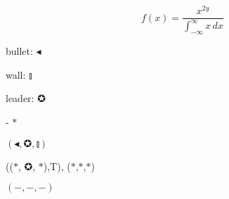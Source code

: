 \documentclass{article}
\begin{document}
\begin{equation*}
  f(x) = \frac{x^{2y}}{\int_{-\infty}^{\infty} x \,dx}  
\end{equation*}

bullet: $\smallblacktriangleleft$

wall: $\talloblong$

leader: $\circledstar$

- $\ast$

$(\smallblacktriangleleft,\circledstar,\talloblong)$

(($\ast$, $\circledstar$, $\ast$),T), ($\ast$,$\ast$,$\ast$)

$(-,-,-)$


\end{document}
